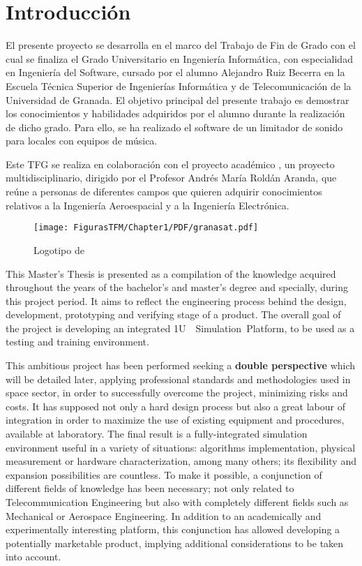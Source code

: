 
\chapter{Introducción}\label{chap:chapter1}
%

El presente proyecto se desarrolla en el marco del Trabajo de Fin de Grado con el cual se finaliza el Grado Universitario en Ingeniería Informática, con especialidad en Ingeniería del Software, cursado por el alumno Alejandro Ruiz Becerra en la Escuela Técnica Superior de Ingenierías Informática y de Telecomunicación de la Universidad de Granada. El objetivo principal del presente trabajo es demostrar los conocimientos y habilidades adquiridos por el alumno durante la realización de dicho grado. Para ello, se ha realizado el software de un limitador de sonido para locales con equipos de música.

Este TFG se realiza en colaboración con el proyecto académico , un proyecto multidisciplinario, dirigido por el Profesor Andrés María Roldán Aranda, que reúne a personas de diferentes campos que quieren adquirir conocimientos relativos a la Ingeniería Aeroespacial y a la Ingeniería Electrónica.


\begin{figure}[H]
    \centering
    \texttt{[image: FigurasTFM/Chapter1/PDF/granasat.pdf]}
    \caption{Logotipo de }
\end{figure}


This Master's Thesis is presented as a compilation of the knowledge acquired throughout the years of the bachelor's and master's degree and specially, during this project period. It aims to reflect the engineering process behind the design, development, prototyping and verifying stage of a product. The overall goal of the project is developing an integrated 1U~~Simulation~Platform, to be used as a testing and training environment.

This ambitious project has been performed seeking a \textbf{double perspective} which will be detailed later, applying professional standards and methodologies used in space sector, in order to successfully overcome the project, minimizing risks and costs. It has supposed not only a hard design process but also a great labour of integration in order to maximize the use of existing equipment and procedures, available at  laboratory. The final result is a fully-integrated simulation environment useful in a variety of situations: algorithms implementation, physical measurement or hardware characterization, among many others; its flexibility and expansion possibilities are countless. To make it possible, a conjunction of different fields of knowledge has been necessary; not only related to Telecommunication Engineering but also with completely different fields such as Mechanical or Aerospace Engineering. In addition to an academically and experimentally interesting platform, this conjunction has allowed developing a potentially marketable product, implying additional considerations to be taken into account.

